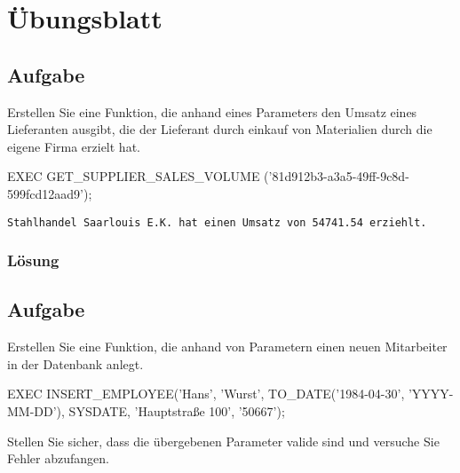 \section{Übungsblatt}
\label{sec:uebung_07}

\subsection{Aufgabe}
\label{sec:uebung_07.aufgabe_01}
Erstellen Sie eine Funktion, die anhand eines Parameters den Umsatz eines Lieferanten ausgibt, die der Lieferant durch einkauf von Materialien durch die eigene Firma erzielt hat.

\begin{example-popup}
  \begin{sqlcode}
    EXEC GET_SUPPLIER_SALES_VOLUME ('81d912b3-a3a5-49ff-9c8d-599fcd12aad9');
  \end{sqlcode}
  \texttt{Stahlhandel Saarlouis E.K. hat einen Umsatz von 54741.54 erziehlt.}
\end{example-popup}

\subsubsection*{Lösung}
\label{sec:uebung_07.aufgabe_01.loesung}

\subsection{Aufgabe}
\label{sec:uebung_07.aufgabe_02}
Erstellen Sie eine Funktion, die anhand von Parametern einen neuen Mitarbeiter in der Datenbank anlegt.

\begin{example-popup}
  \begin{sqlcode}
    EXEC INSERT_EMPLOYEE('Hans', 'Wurst', TO_DATE('1984-04-30', 'YYYY-MM-DD'), SYSDATE, 'Hauptstraße 100', '50667');
  \end{sqlcode}
\end{example-popup}

Stellen Sie sicher, dass die übergebenen Parameter valide sind und versuche Sie Fehler abzufangen.

